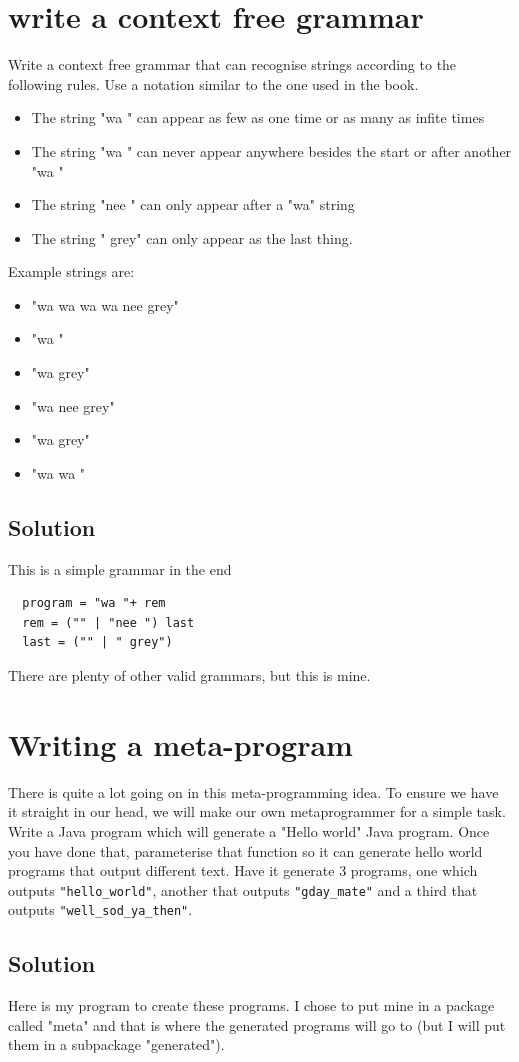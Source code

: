 \documentclass[twoside=false, DIV=14]{scrartcl}
\begin{document}
\section*{write a context free grammar}
Write a context free grammar that can recognise strings according to the following rules. Use a notation similar to the one used in the book.
\begin{itemize}
    \item The string "wa " can appear as few as one time or as many as infite times
    \item The string "wa " can never appear anywhere besides the start or after another "wa "
    \item The string "nee " can only appear after a "wa" string
    \item The string " grey" can only appear as the last thing.
\end{itemize}
  Example strings are:
\begin{itemize}
    \item "wa wa wa wa nee  grey"
    \item "wa "
    \item "wa  grey"
    \item "wa nee  grey"
    \item "wa  grey"
    \item "wa wa "
\end{itemize}
\subsection*{Solution}
  This is a simple grammar in the end
  \begin{lstlisting}
  program = "wa "+ rem
  rem = ("" | "nee ") last
  last = ("" | " grey")
\end{lstlisting}

There are plenty of other valid grammars, but this is mine.

\section*{Writing a meta-program}
  There is quite a lot going on in this meta-programming idea.  To ensure we have it straight in our head, we will make our own metaprogrammer for a simple task.
  Write a Java program which will generate a "Hello world" Java program.  Once you have done that, parameterise that function so it can generate hello world programs that output different text.  Have it generate 3 programs, one which outputs \lstinline|"hello_world"|, another that outputs \lstinline|"gday_mate"| and a third that outputs \lstinline|"well_sod_ya_then"|.
\subsection*{Solution}
  Here is my program to create these programs.  I chose to put mine in a package called "meta" and that is where the generated programs will go to (but I will put them in a subpackage "generated").
  
\end{document}
